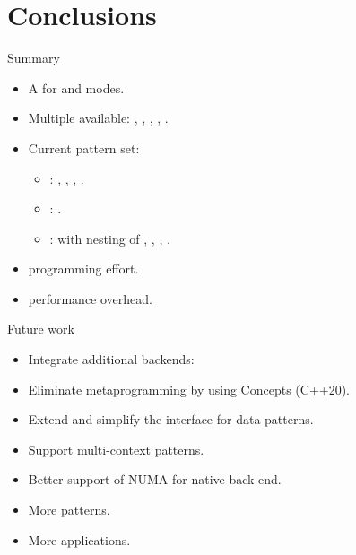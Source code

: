 \section{Conclusions}

\begin{frame}[t]{Summary}
\begin{itemize}
  \item A  for 
         and  modes.
  \vfill
  \item Multiple  available:
        , ,
        , , .
  \vfill
  \item Current pattern set:
    \begin{itemize}
      \item {}: , , , .
      \item {}: .
      \item {}:  with nesting of , ,
            , .
    \end{itemize}

  \vfill
  \item {} programming effort.
  \vfill
  \item {} performance overhead.
\end{itemize}
\end{frame}

\begin{frame}[t]{Future work}
\begin{itemize}
  \item Integrate additional backends:
  \item Eliminate metaprogramming by using Concepts (C++20).
  \item Extend and simplify the interface for data patterns.
  \item Support multi-context patterns.
  \item Better support of NUMA for native back-end. 
  \item More patterns.
  \item More applications.
\end{itemize}
\end{frame}


